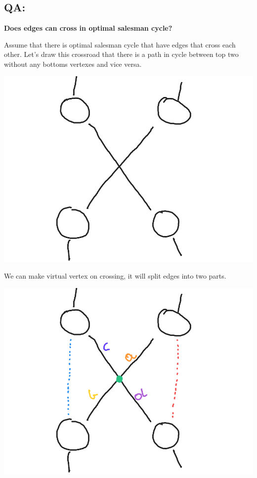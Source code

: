 \documentclass{article}
\begin{document}
\subsection*{QA:}
\begin{center}
    \textbf{Does edges can cross in optimal salesman cycle?}
\end{center}
Assume that there is optimal salesman cycle that have edges that cross each other. Let's draw this crossroad that there is a  path in cycle between top two without any bottoms vertexes and vice versa.
\begin{center}
    \includegraphics[scale=0.14]{4} 
\end{center}
We can make virtual vertex on crossing, it will split edges into two parts.
\begin{center}
    \includegraphics[scale=0.14]{5} 
\end{center}
\end{document}
